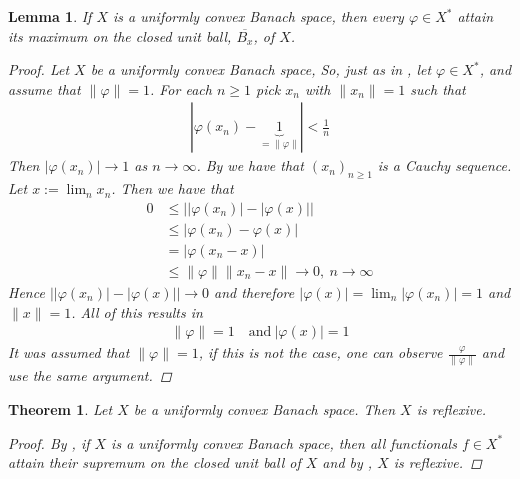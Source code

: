 \documentclass[10pt,twoside,openany,final]{memoir}
\theoremstyle{break}
\newtheorem{theorem}[section]{Theorem}
\newtheorem{lemma}[section]{Lemma}
\theoremstyle{Break}
\newcommand{\lv}{\lVert}
\newcommand{\rv}{\rVert}
\begin{document}
\begin{lemma}\label{rudin 3}
If $X$ is a uniformly convex Banach space, then every $\varphi \in X^*$ attain its maximum on the closed unit ball, $\overline{B_{x}}$, of $X$.
\begin{proof}
Let $X$ be a uniformly convex Banach space, So, just as in , let $\varphi \in X^*$, and assume that $\lv \varphi\rv =1$. For each $n \geq 1$ pick $x_{n}$ with $\lv x_{n} \rv = 1$ such that
\begin{align*}
|\varphi(x_{n}) - \underbrace{1}_{=\lv \varphi \rv} | < \frac1n
\end{align*}
Then $|\varphi (x_{n}) | \to 1$ as $n \to \infty$. By  we have that $(x_{n})_{n \geq 1}$ is a Cauchy sequence. Let $x:= \lim_{n} x_{n}$. Then we have that 
\begin{align*}
0&\leq \big| |\varphi (x_{n})| - | \varphi(x)| \big| \\&\leq |\varphi(x_{n})-\varphi(x)|\\
&= |\varphi(x_{n}-x)|\\
&\leq \lv \varphi\rv \lv x_{n}-x\rv \to 0, \ n \to \infty
\end{align*}
Hence $\big| |\varphi(x_{n})| - |\varphi(x)| \big| \to 0$ and therefore $|\varphi(x)|=\lim_{n} |\varphi (x_{n})|=1$ and $\lv x \rv =1$. All of this results in
\begin{align*}
\lv \varphi \rv =1 \quad \text{and} \ |\varphi(x)|=1
\end{align*}
It was assumed that $\lv \varphi \rv =1$, if this is not the case, one can observe $\frac{\varphi}{\lv \varphi\rv}$ and use the same argument.
\end{proof}
\end{lemma}

\begin{theorem}
Let $X$ be a uniformly convex Banach space. Then $X$ is reflexive.
\begin{proof}
By , if $X$ is a uniformly convex Banach space, then all functionals $f \in X^*$ attain their supremum on the closed unit ball of $X$ and by , $X$ is reflexive.
\end{proof}
\end{theorem}
\printbibliography
\end{document}
